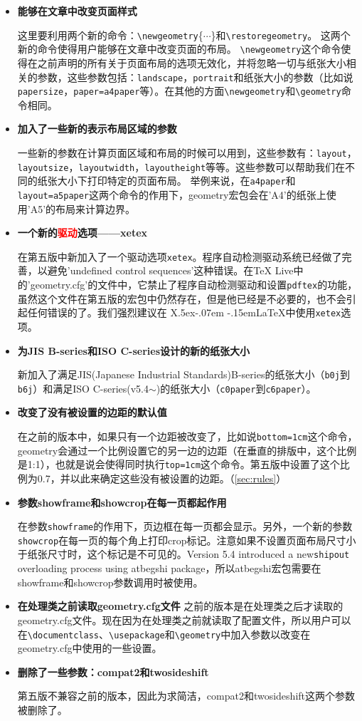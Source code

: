 \documentclass[titlepage]{ctexart}
\DeclareRobustCommand\XeLaTeX{%
      X\lower.5ex\hbox{\kern-.07em\reflectbox{E}}%
      \kern-.15em\LaTeX}
\def\Gm{\textsf{geometry}}
\begin{document}
	\begin{itemize}
	\item \textbf{能够在文章中改变页面样式}\par
	这里要利用两个新的命令：\verb|\newgeometry|\{$\cdots$\}和\verb|\restoregeometry|。
	这两个新的命令使得用户能够在文章中改变页面的布局。
	\verb|\newgeometry|这个命令使得在之前声明的所有关于页面布局的选项无效化，并将忽略一切与纸张大小相关的参数，这些参数包括：\verb|landscape|，\verb|portrait|和纸张大小的参数（比如说\verb|papersize|，\verb|paper=a4paper|等）。在其他的方面\verb|\newgeometry|和\verb|\geometry|命令相同。	
	\item \textbf{加入了一些新的表示布局区域的参数}\par
	一些新的参数在计算页面区域和布局的时候可以用到，这些参数有：\verb|layout|，\verb|layoutsize|，\verb|layoutwidth|，\verb|layoutheight|等等。这些参数可以帮助我们在不同的纸张大小下打印特定的页面布局。
	举例来说，在\verb|a4paper|和\verb|layout=a5paper|这两个命令的作用下，\Gm 宏包会在'A4'的纸张上使用'A5'的布局来计算边界。
	\item \textbf{一个新的\textcolor{red}{驱动}选项——\textsf{xetex}}\par
	在第五版中新加入了一个驱动选项\verb|xetex|。程序自动检测驱动系统已经做了完善，以避免'undefined control sequences'这种错误。在\TeX{} Live中的'geometry.cfg'的文件中，它禁止了程序自动检测驱动和设置\verb|pdftex|的功能，虽然这个文件在第五版的宏包中仍然存在，但是他已经是不必要的，也不会引起任何错误的了。我们强烈建议在\XeLaTeX 中使用\verb|xetex|选项。
	\item \textbf{为JIS B-series和ISO C-series设计的新的纸张大小}\par
	新加入了满足JIS(Japanese Industrial Standards)B-series的纸张大小（\verb|b0j|到\verb|b6j|）和满足ISO C-series(v5.4$\sim$)的纸张大小（\verb|c0paper|到\verb|c6paper|）。
	\item \textbf{改变了没有被设置的边距的默认值}\par
	在之前的版本中，如果只有一个边距被改变了，比如说\verb|bottom=1cm|这个命令，\Gm 会通过一个比例设置它的另一边的边距（在垂直的排版中，这个比例是1:1），也就是说会使得同时执行\verb|top=1cm|这个命令。第五版中设置了这个比例为0.7，并以此来确定这些没有被设置的边距。（\ref{sec:rules}）
	\item \textbf{参数\textsf{showframe}和\textsf{showcrop}在每一页都起作用}\par
	在参数\verb|showframe|的作用下，页边框在每一页都会显示。另外，一个新的参数\verb|showcrop|在每一页的每个角上打印crop标记。注意如果不设置页面布局尺寸小于纸张尺寸时，这个标记是不可见的。Version 5.4 introduced a new\verb|shipout| overloading process using \textsf{atbegshi} package，所以\textsf{atbegshi}宏包需要在showframe和showcrop参数调用时被使用。
	\item \textbf{在处理类之前读取geometry.cfg文件}
	之前的版本是在处理类之后才读取的geometry.cfg文件。现在因为在处理类之前就读取了配置文件，所以用户可以在\verb|\documentclass|、\verb|\usepackage|和\verb|\geometry|中加入参数以改变在\textsf{geometry.cfg}中使用的一些设置。
	\item \textbf{删除了一些参数：compat2和twosideshift}\par
	第五版不兼容之前的版本，因此为求简洁，\textsf{compat2}和\textsf{twosideshift}这两个参数被删除了。
	\end{itemize}
\end{document}
